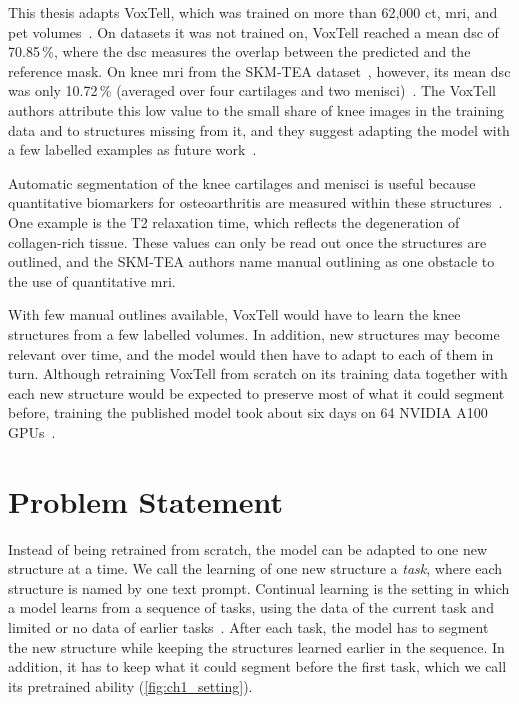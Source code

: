 This thesis adapts VoxTell, which was trained on more than 62{,}000 \gls{ct}, \gls{mri}, and \gls{pet} volumes~\cite{rokuss2025voxtellfreetextpromptableuniversal}.
On datasets it was not trained on, VoxTell reached a mean \gls{dsc} of 70.85\,\%, where the \gls{dsc} measures the overlap between the predicted and the reference mask.
On knee \gls{mri} from the SKM-TEA dataset~\cite{desai2021skmtea}, however, its mean \gls{dsc} was only 10.72\,\% (averaged over four cartilages and two menisci)~\cite[Suppl.~Table~9]{rokuss2025voxtellfreetextpromptableuniversal}.
The VoxTell authors attribute this low value to the small share of knee images in the training data and to structures missing from it, and they suggest adapting the model with a few labelled examples as future work~\cite[Sec.~6]{rokuss2025voxtellfreetextpromptableuniversal}.

Automatic segmentation of the knee cartilages and menisci is useful because quantitative biomarkers for osteoarthritis are measured within these structures~\cite{desai2021skmtea}.
One example is the T2 relaxation time, which reflects the degeneration of collagen-rich tissue.
These values can only be read out once the structures are outlined, and the SKM-TEA authors name manual outlining as one obstacle to the use of quantitative \gls{mri}.

With few manual outlines available, VoxTell would have to learn the knee structures from a few labelled volumes.
In addition, new structures may become relevant over time, and the model would then have to adapt to each of them in turn.
Although retraining VoxTell from scratch on its training data together with each new structure would be expected to preserve most of what it could segment before, training the published model took about six days on 64 NVIDIA A100 GPUs~\cite{rokuss2025voxtellfreetextpromptableuniversal}.

\section{Problem Statement}
\label{sec:intro-problem}

Instead of being retrained from scratch, the model can be adapted to one new structure at a time.
We call the learning of one new structure a \emph{task}, where each structure is named by one text prompt.
Continual learning is the setting in which a model learns from a sequence of tasks, using the data of the current task and limited or no data of earlier tasks~\cite[Sec.~2]{delange2022}.
After each task, the model has to segment the new structure while keeping the structures learned earlier in the sequence.
In addition, it has to keep what it could segment before the first task, which we call its pretrained ability (\cref{fig:ch1_setting}).

